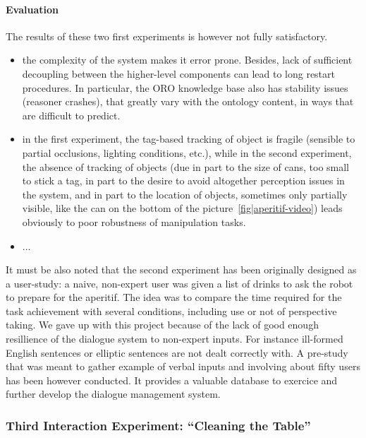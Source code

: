 \paragraph{Evaluation} The results of these two first experiments is however
not fully satisfactory.

\begin{itemize}

    \item the complexity of the system makes it error prone. Besides, lack of
        sufficient decoupling between the higher-level components can lead to
        long restart procedures. In particular, the ORO knowledge base also has
        stability issues (reasoner crashes), that greatly vary with the
        ontology content, in ways that are difficult to predict.

    \item in the first experiment, the tag-based tracking of object is fragile
        (sensible to partial occlusions, lighting conditions, etc.), while in
        the second experiment, the absence of tracking of objects (due in part
        to the size of cans, too small to stick a tag, in part to the desire to
        avoid altogether perception issues in the system, and in part to the
        location of objects, sometimes only partially visible, like the can on
        the bottom of the picture~\ref{fig|aperitif-video}) leads obviously to
        poor robustness of manipulation tasks.

    \item ...
\end{itemize}

It must be also noted that the second experiment has been originally designed
as a user-study: a naive, non-expert user was given a list of drinks to ask the
robot to prepare for the aperitif. The idea was to compare the time required
for the task achievement with several conditions, including use or not of
perspective taking. We gave up with this project because of the lack of good
enough resillience of the dialogue system to non-expert inputs. For instance
ill-formed English sentences or elliptic sentences are not dealt correctly
with. A pre-study that was meant to gather example of verbal inputs and
involving about fifty users has been however conducted. It provides a valuable
database to exercice and further develop the dialogue management system.

\subsubsection{Third Interaction Experiment: ``Cleaning the Table''}
\label{sect|expe3}

